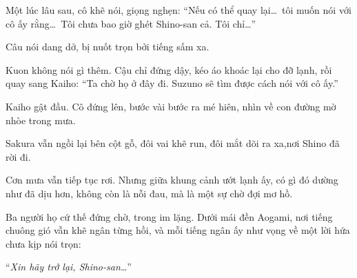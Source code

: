 \documentclass[../main.tex]{subfiles}
\begin{document}
Một lúc lâu sau, cô khẽ nói, giọng nghẹn: ``Nếu có thể quay lại\dots\ tôi muốn nói với cô ấy rằng\dots\ Tôi chưa bao giờ ghét Shino-san cả. Tôi chỉ\dots''

Câu nói dang dở, bị nuốt trọn bởi tiếng sấm xa.

Kuon không nói gì thêm. Cậu chỉ đứng dậy, kéo áo khoác lại cho đỡ lạnh, rồi quay sang Kaiho: ``Ta chờ họ ở đây đi. Suzuno sẽ tìm được cách nói với cô ấy.''

Kaiho gật đầu. Cô đứng lên, bước vài bước ra mé hiên, nhìn về con đường mờ nhòe trong mưa.

Sakura vẫn ngồi lại bên cột gỗ, đôi vai khẽ run, đôi mắt dõi ra xa,nơi Shino đã rời đi.

Cơn mưa vẫn tiếp tục rơi. Nhưng giữa khung cảnh ướt lạnh ấy, có gì đó dường như đã dịu hơn, không còn là nỗi đau, mà là một sự chờ đợi mơ hồ.

Ba người họ cứ thế đứng chờ, trong im lặng. Dưới mái đền Aogami, nơi tiếng chuông gió vẫn khẽ ngân từng hồi, và mỗi tiếng ngân ấy như vọng về một lời hứa chưa kịp nói trọn:

``\textit{Xin hãy trở lại, Shino-san\dots}''
\end{document}
